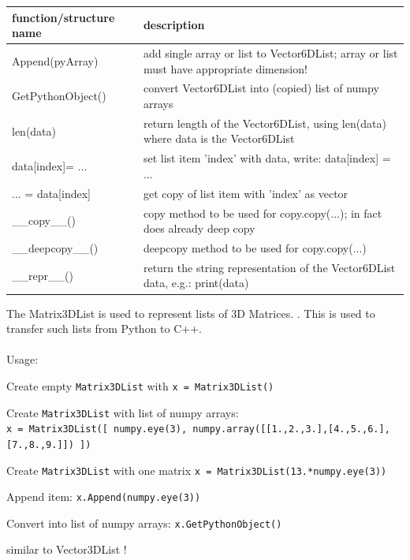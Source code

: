 \begin{center}
\footnotesize
\begin{longtable}{| p{8cm} | p{8cm} |} 
\hline
{\bf function/structure name} & {\bf description}\\ \hline
  Append(pyArray) & add single array or list to Vector6DList; array or list must have appropriate dimension!\\ \hline 
  GetPythonObject() & convert Vector6DList into (copied) list of numpy arrays\\ \hline 
  len(data) & return length of the Vector6DList, using len(data) where data is the Vector6DList\\ \hline 
  data[index]= ... & set list item 'index' with data, write: data[index] = ...\\ \hline 
  ... = data[index] & get copy of list item with 'index' as vector\\ \hline 
  \_\_copy\_\_() & copy method to be used for copy.copy(...); in fact does already deep copy\\ \hline 
  \_\_deepcopy\_\_() & deepcopy method to be used for copy.copy(...)\\ \hline 
  \_\_repr\_\_() & return the string representation of the Vector6DList data, e.g.: print(data)\\ \hline 
\end{longtable}
\end{center}

The Matrix3DList is used to represent lists of 3D Matrices. . This is used to transfer such lists from Python to C++. \\ \\ Usage: \bi
  \item Create empty \texttt{Matrix3DList} with \texttt{x = Matrix3DList()} 
  \item Create \texttt{Matrix3DList} with list of numpy arrays:\\\texttt{x = Matrix3DList([ numpy.eye(3), numpy.array([[1.,2.,3.],[4.,5.,6.],[7.,8.,9.]]) ])}
  \item Create \texttt{Matrix3DList} with one matrix \texttt{x = Matrix3DList(13.*numpy.eye(3))} 
  \item Append item: \texttt{x.Append(numpy.eye(3))}
  \item Convert into list of numpy arrays: \texttt{x.GetPythonObject()}
  \item similar to Vector3DList !
\ei



